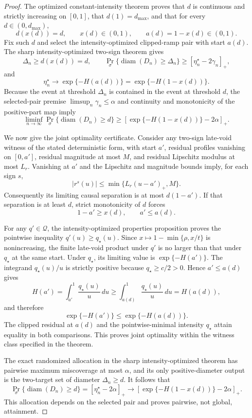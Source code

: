 \documentclass{article}
\begin{document}
\begin{proof}
The optimized constant-intensity theorem proves that \(d\) is continuous and strictly increasing on \([0,1]\), that \(d(1)=d_{\max}\), and that for every \(d\in(0,d_{\max})\),
\[
 d(x(d))=d,
 \qquad x(d)\in(0,1),
 \qquad a(d)=1-x(d)\in(0,1).
\]
Fix such \(d\) and select the intensity-optimized clipped-ramp pair with start \(a(d)\).  The sharp intensity-optimized two-sign theorem gives
\[
 \Delta_n\ge d(x(d))=d,
 \qquad
 \Pr_\sigma\{\operatorname{diam}(D_n)\ge\Delta_n\}
 \ge[\eta_n^\star-2\gamma_n]_+,
\]
and
\[
 \eta_n^\star\longrightarrow
 \exp\{-H(a(d))\}
 =\exp\{-H(1-x(d))\}.
\]
Because the event at threshold \(\Delta_n\) is contained in the event at threshold \(d\), the selected-pair premise \(\limsup_n\gamma_n\le\alpha\) and continuity and monotonicity of the positive-part map imply
\[
 \liminf_{n\to\infty}
 \Pr_\sigma\{\operatorname{diam}(D_n)\ge d\}
 \ge
 \left[\exp\{-H(1-x(d))\}-2\alpha\right]_+.
\]

We now give the joint optimality certificate.  Consider any two-sign late-void witness of the stated deterministic form, with start \(a'\), residual profiles vanishing on \([0,a']\), residual magnitude at most \(M\), and residual Lipschitz modulus at most \(L_r\).  Vanishing at \(a'\) and the Lipschitz and magnitude bounds imply, for each sign \(s\),
\[
 |r^s(u)|\le\min\{L_r(u-a')_+,M\}.
\]
Consequently its limiting causal separation is at most \(d(1-a')\).  If that separation is at least \(d\), strict monotonicity of \(d\) forces
\[
 1-a'\ge x(d),
 \qquad a'\le a(d).
\]

For any \(q'\in\mathcal Q\), the intensity-optimized properties proposition proves the pointwise inequality \(q'(u)\ge q_\star(u)\).  Since \(x\mapsto1-\min\{\rho,x/t\}\) is nonincreasing, the finite late-void product under \(q'\) is no larger than that under \(q_\star\) at the same start.  Under \(q_\star\), its limiting value is \(\exp\{-H(a')\}\).  The integrand \(q_\star(u)/u\) is strictly positive because \(q_\star\ge c/2>0\).  Hence \(a'\le a(d)\) gives
\[
 H(a')=\int_{a'}^1\frac{q_\star(u)}u\,du
 \ge\int_{a(d)}^1\frac{q_\star(u)}u\,du=H(a(d)),
\]
and therefore
\[
 \exp\{-H(a')\}\le\exp\{-H(a(d))\}.
\]
The clipped residual at \(a(d)\) and the pointwise-minimal intensity \(q_\star\) attain equality in both comparisons.  This proves joint optimality within the witness class specified in the theorem.

The exact randomized allocation in the sharp intensity-optimized theorem has pairwise maximum miscoverage at most \(\alpha\), and its only positive-diameter output is the two-target set of diameter \(\Delta_n\ge d\).  It follows that
\[
 \Pr_\sigma\{\operatorname{diam}(D_n)\ge d\}
 =[\eta_n^\star-2\alpha]_+
 \longrightarrow
 \left[\exp\{-H(1-x(d))\}-2\alpha\right]_+.
\]
This allocation depends on the selected pair and proves pairwise, not global, attainment.


\end{proof}
\end{document}
